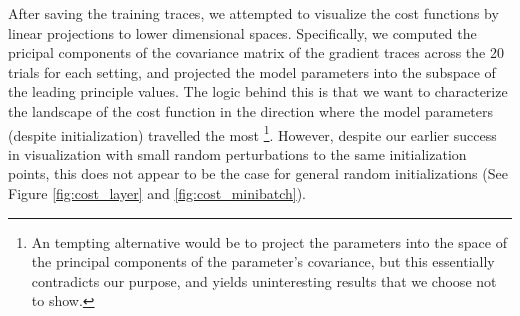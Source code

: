 After saving the training traces, we attempted to visualize the cost functions by
linear projections to lower dimensional spaces. Specifically, we computed the pricipal
components of the covariance matrix of the gradient traces across the 20 trials
for each setting, and projected the model parameters into the subspace of the leading
principle values. The logic behind this is that we want to characterize the landscape
of the cost function in the direction where the model parameters (despite initialization)
travelled the most \footnote{An tempting alternative would be to project the parameters
into the space of the principal components of the parameter's covariance, but this 
essentially contradicts our purpose, and yields uninteresting results that we choose not
to show.}. However, despite our earlier success in visualization with small random 
perturbations to the same initialization points, this does not appear to be the case 
for general random initializations (See Figure \ref{fig:cost_layer} and \ref{fig:cost_minibatch}).